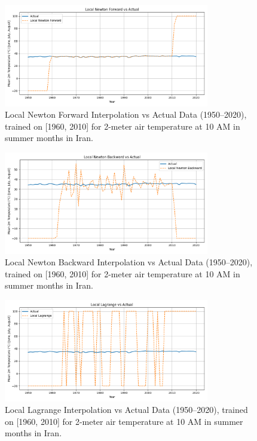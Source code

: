 \begin{figure}[htbp]
    \centering
    \includegraphics[width=0.8\textwidth]{../figs/Local_Newton_Forward_vs_actual[1960, 2010, 1].png}
    \caption{Local Newton Forward Interpolation vs Actual Data (1950--2020), trained on [1960, 2010] for 2-meter air temperature at 10 AM in summer months in Iran.}
    \label{fig:forward2}
\end{figure}

\begin{figure}[htbp]
    \centering
    \includegraphics[width=0.8\textwidth]{../figs/Local_Newton_Backward_vs_actual[1960, 2010, 1].png}
    \caption{Local Newton Backward Interpolation vs Actual Data (1950--2020), trained on [1960, 2010] for 2-meter air temperature at 10 AM in summer months in Iran.}
    \label{fig:backward2}
\end{figure}

\begin{figure}[htbp]
    \centering
    \includegraphics[width=0.8\textwidth]{../figs/Local_Lagrange_vs_actual[1960, 2010, 1].png}
    \caption{Local Lagrange Interpolation vs Actual Data (1950--2020), trained on [1960, 2010] for 2-meter air temperature at 10 AM in summer months in Iran.}
    \label{fig:lagrange2}
\end{figure}

